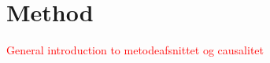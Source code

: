 \documentclass[../Thesis.tex]{subfiles}
\begin{document}







\chapter{Method}\label{chap:method}
\textcolor{red}{General introduction to metodeafsnittet og causalitet}
\end{document}
